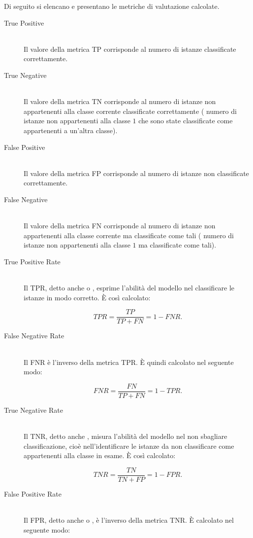 Di seguito si elencano e presentano le metriche di valutazione calcolate.
\begin{description}
	\item[True Positive] \hfill \\
	Il valore della metrica \acf{TP} corrisponde al numero di istanze classificate correttamente.
	\item[True Negative] \hfill \\
	Il valore della metrica \acf{TN} corrisponde al numero di istanze non appartenenti alla classe corrente classificate correttamente (\eg{} numero di istanze non appartenenti alla classe $1$ che sono state classificate come appartenenti a un'altra classe).
	\item[False Positive] \hfill \\
	Il valore della metrica \acf{FP} corrisponde al numero di istanze non classificate correttamente.
	\item[False Negative] \hfill \\
	Il valore della metrica \acf{FN} corrisponde al numero di istanze non appartenenti alla classe corrente ma classificate come tali (\eg{} numero di istanze non appartenenti alla classe $1$ ma classificate come tali).
	\item[True Positive Rate] \hfill \\
	Il \acf{TPR}, detto anche \emph{} o \emph{}, esprime l'abilità del modello nel classificare le istanze in modo corretto. \`E così calcolato:\par
	\[TPR=\frac{TP}{TP + FN} = 1 - FNR\text{.}\]
	\item[False Negative Rate] \hfill \\
	Il \acf{FNR} è l'inverso della metrica \acs{TPR}. \`E quindi calcolato nel seguente modo:\par
	\[FNR=\frac{FN}{TP + FN} = 1 - TPR\text{.}\]
	\item[True Negative Rate] \hfill \\
	Il \acf{TNR}, detto anche \emph{}, misura l'abilità del modello nel non sbagliare classificazione, cioè nell'identificare le istanze da non classificare come appartenenti alla classe in esame. \`E così calcolato:\par
	\[TNR=\frac{TN}{TN + FP} = 1 - FPR\text{.}\]
	\item[False Positive Rate] \hfill \\
	Il \acf{FPR}, detto anche \emph{} o \emph{}, è l'inverso della metrica \acs{TNR}. \`E calcolato nel seguente modo:\par

\end{description}
